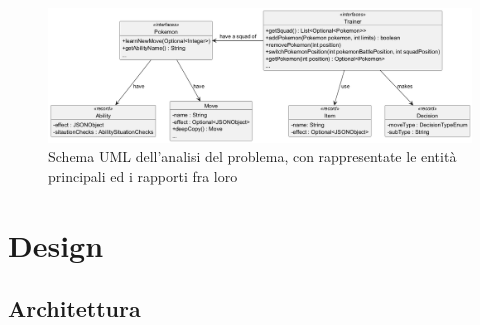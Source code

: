 \documentclass[a4paper,12pt]{report}
\begin{document}
{\begin{figure}[h]
\centering{}
\includegraphics[width=\textwidth]{immagini/modello.png}
\caption{Schema UML dell'analisi del problema, con rappresentate le entità principali ed i rapporti fra loro}
\end{figure}

\chapter{Design}

\section{Architettura}

}
\end{document}
